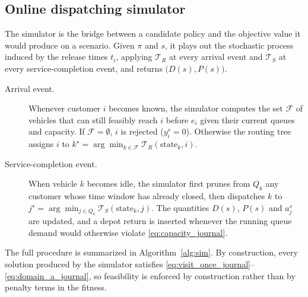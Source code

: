 \documentclass[pdflatex]{sn-jnl}
\begin{document}
\subsection{Online dispatching simulator}
\label{subsec:simulator-method}

The simulator is the bridge between a candidate policy and the objective
value it would produce on a scenario. Given $\pi$ and $s$, it plays out
the stochastic process induced by the release times $t_i$, applying
$\mathcal{T}_R$ at every arrival event and $\mathcal{T}_S$ at every
service-completion event, and returns $\bigl(D(s),P(s)\bigr)$.

\begin{description}
    \item[Arrival event.] Whenever customer $i$ becomes known, the
          simulator computes the set $\mathcal{F}$ of vehicles that can
          still feasibly reach $i$ before $e_i$ given their current
          queues and capacity. If $\mathcal{F}=\emptyset$, $i$ is
          rejected ($y_i^s=0$). Otherwise the routing tree assigns $i$
          to $k^\star=\arg\min_{k\in\mathcal{F}}
          \mathcal{T}_R(\mathrm{state}_k,i)$.
    \item[Service-completion event.] When vehicle $k$ becomes idle, the
          simulator first prunes from $Q_k$ any customer whose time
          window has already closed, then dispatches $k$ to
          $j^\star=\arg\min_{j\in Q_k}
          \mathcal{T}_S(\mathrm{state}_k,j)$. The quantities $D(s)$,
          $P(s)$ and $a_j^s$ are updated, and a depot return is
          inserted whenever the running queue demand would otherwise
          violate \eqref{eq:capacity_journal}.
\end{description}

The full procedure is summarized in Algorithm~\ref{alg:sim}. By
construction, every solution produced by the simulator satisfies
\eqref{eq:visit_once_journal}--\eqref{eq:domain_a_journal}, so
feasibility is enforced by construction rather than by penalty
terms in the fitness.
\end{document}
